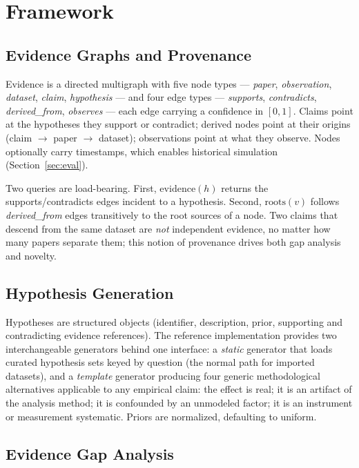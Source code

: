 \documentclass[11pt]{article}
\begin{document}
\section{Framework}

\subsection{Evidence Graphs and Provenance}
\label{sec:graph}

Evidence is a directed multigraph with five node types ---
\emph{paper}, \emph{observation}, \emph{dataset}, \emph{claim},
\emph{hypothesis} --- and four edge types --- \emph{supports},
\emph{contradicts}, \emph{derived\_from}, \emph{observes} --- each edge
carrying a confidence in $[0,1]$. Claims point at the hypotheses they
support or contradict; derived nodes point at their origins
(claim $\to$ paper $\to$ dataset); observations point at what they
observe. Nodes optionally carry timestamps, which enables historical
simulation (Section~\ref{sec:eval}).

Two queries are load-bearing. First,
$\mathrm{evidence}(h)$ returns the supports/contradicts edges incident to
a hypothesis. Second, $\mathrm{roots}(v)$ follows
\emph{derived\_from} edges transitively to the root sources of a node.
Two claims that descend from the same dataset are \emph{not} independent
evidence, no matter how many papers separate them; this notion of
provenance drives both gap analysis and novelty.

\subsection{Hypothesis Generation}

Hypotheses are structured objects (identifier, description, prior,
supporting and contradicting evidence references). The reference
implementation provides two interchangeable generators behind one
interface: a \emph{static} generator that loads curated hypothesis sets
keyed by question (the normal path for imported datasets), and a
\emph{template} generator producing four generic methodological
alternatives applicable to any empirical claim: the effect is real; it is
an artifact of the analysis method; it is confounded by an unmodeled
factor; it is an instrument or measurement systematic. Priors are
normalized, defaulting to uniform.

\subsection{Evidence Gap Analysis}
\label{sec:gaps}
\end{document}
